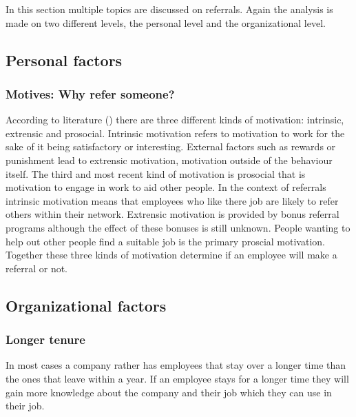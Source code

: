 \documentclass[Main.tex]{subfiles}
\begin{document}
In this section multiple topics are discussed on referrals. Again the analysis is made on two different levels, the personal level and the organizational level. 

\subsection*{Personal factors}

\subsubsection*{Motives: Why refer someone?}

According to literature (\cite{motives}) there are three different kinds of motivation: intrinsic, extrensic and prosocial. Intrinsic motivation refers to motivation to work for the sake of it being satisfactory or interesting. External factors such as rewards or punishment lead to extrensic motivation, motivation outside of the behaviour itself. The third and most recent kind of motivation is prosocial that is motivation to engage in work to aid other people. In the context of referrals intrinsic motivation means that employees who like there job are likely to refer others within their network. Extrensic motivation is provided by bonus referral programs although the effect of these bonuses is still unknown. People wanting to help out other people find a suitable job is the primary proscial motivation. Together these three kinds of motivation determine if an employee will make a referral or not.



\subsection*{Organizational factors}

\subsubsection*{Longer tenure} %
In most cases a company rather has employees that stay over a longer time than the ones that leave within a year. If an employee stays for a longer time they will gain more knowledge about the company and their job which they can use in their job. 
\end{document}
